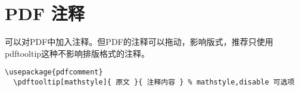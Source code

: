 ﻿\section{PDF 注释}

可以对PDF中加入注释。但PDF的注释可以拖动，影响版式，推荐只使用pdftooltip这种不影响排版格式的注释。

\begin{lstlisting}[language={[LaTeX]TeX}]
  \usepackage{pdfcomment}
  \pdftooltip[mathstyle]{ 原文 }{ 注释内容 } % mathstyle,disable 可选项
\end{lstlisting}

